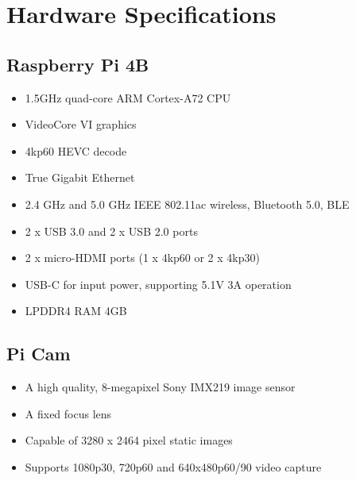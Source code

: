 \chapter{Hardware Specifications}
    \label{appendices:hardware_specs}
        \section{Raspberry Pi 4B}
        \begin{itemize}
            \item 1.5GHz quad-core ARM Cortex-A72 CPU
            \item VideoCore VI graphics
            \item 4kp60 HEVC decode
            \item True Gigabit Ethernet
            \item 2.4 GHz and 5.0 GHz IEEE 802.11ac wireless, Bluetooth 5.0, BLE
            \item 2 x USB 3.0 and 2 x USB 2.0 ports
            \item 2 x micro-HDMI ports (1 x 4kp60 or 2 x 4kp30)
            \item USB-C for input power, supporting 5.1V 3A operation
            \item LPDDR4 RAM 4GB
        \end{itemize}
        
        \section{Pi Cam}
        \begin{itemize}
            \item A high quality, 8-megapixel Sony IMX219 image sensor
            \item A fixed focus lens
            \item Capable of 3280 x 2464 pixel static images
            \item Supports 1080p30, 720p60 and 640x480p60/90 video capture
        \end{itemize}